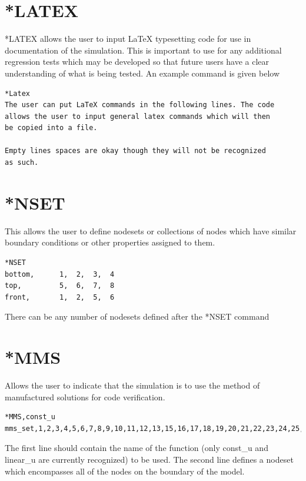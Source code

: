 \documentclass{asme2ej}
\begin{document}
\section{*LATEX}

*LATEX allows the user to input LaTeX typesetting code for use in documentation of the simulation. This is important to use for any additional regression tests which may be developed so that future users have a clear understanding of what is being tested. An example command is given below

\begin{verbatim}
*Latex
The user can put LaTeX commands in the following lines. The code
allows the user to input general latex commands which will then 
be copied into a file.

Empty lines spaces are okay though they will not be recognized 
as such.
\end{verbatim}

\section{*NSET}

This allows the user to define nodesets or collections of nodes which have similar boundary conditions or other properties assigned to them.

\begin{verbatim}
*NSET
bottom,      1,  2,  3,  4
top,         5,  6,  7,  8
front,       1,  2,  5,  6
\end{verbatim}

There can be any number of nodesets defined after the *NSET command

\section{*MMS}

Allows the user to indicate that the simulation is to use the method of manufactured solutions for code verification.

\begin{verbatim}
*MMS,const_u
mms_set,1,2,3,4,5,6,7,8,9,10,11,12,13,15,16,17,18,19,20,21,22,23,24,25,26,27
\end{verbatim}

The first line should contain the name of the function (only const\_u and linear\_u are currently recognized) to be used. The second line defines a nodeset which encompasses all of the nodes on the boundary of the model.

\FloatBarrier



\end{document}
